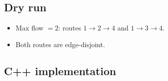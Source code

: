 \subsection*{Dry run}


\begin{itemize}
  \item Max flow $=2$: routes $1\to2\to4$ and $1\to3\to4$.
  \item Both routes are edge-disjoint.
\end{itemize}

\subsection*{C++ implementation}

